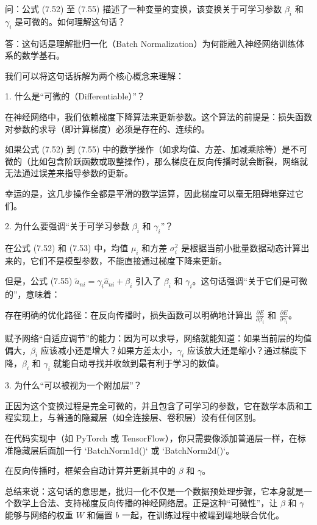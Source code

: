 \documentclass{article}
\begin{document}
{\color{blue}
问：公式 (7.52) 至 (7.55) 描述了一种变量的变换，该变换关于可学习参数 $\beta_i$ 和 $\gamma_i$ 是可微的。如何理解这句话？

答：这句话是理解批归一化（Batch Normalization）为何能融入神经网络训练体系的数学基石。

我们可以将这句话拆解为两个核心概念来理解：

1. 什么是“可微的（Differentiable）”？

在神经网络中，我们依赖梯度下降算法来更新参数。这个算法的前提是：损失函数对参数的求导（即计算梯度）必须是存在的、连续的。

如果公式 (7.52) 到 (7.55) 中的数学操作（如求均值、方差、加减乘除等）是不可微的（比如包含阶跃函数或取整操作），那么梯度在反向传播时就会断裂，网络就无法通过误差来指导参数的更新。

幸运的是，这几步操作全都是平滑的数学运算，因此梯度可以毫无阻碍地穿过它们。

2. 为什么要强调“关于可学习参数 $\beta_i$ 和 $\gamma_i$”？

在公式 (7.52) 和 (7.53) 中，均值 $\mu_i$ 和方差 $\sigma_i^2$ 是根据当前小批量数据动态计算出来的，它们不是模型参数，不能直接通过梯度下降来更新。

但是，公式 (7.55) $\widetilde{a}_{ni} = \gamma_i \widehat{a}_{ni} + \beta_i$ 引入了 $\beta_i$ 和 $\gamma_i$。这句话强调“关于它们是可微的”，意味着：

存在明确的优化路径：在反向传播时，损失函数可以明确地计算出 $\frac{\partial E}{\partial \beta_i}$ 和 $\frac{\partial E}{\partial \gamma_i}$。

赋予网络“自适应调节”的能力：因为可以求导，网络就能知道：如果当前层的均值偏大，$\beta_i$ 应该减小还是增大？如果方差太小，$\gamma_i$ 应该放大还是缩小？通过梯度下降，$\beta_i$ 和 $\gamma_i$ 就能自动寻找并收敛到最有利于学习的数值。

3. 为什么“可以被视为一个附加层”？

正因为这个变换过程是完全可微的，并且包含了可学习的参数，它在数学本质和工程实现上，与普通的隐藏层（如全连接层、卷积层）没有任何区别。

在代码实现中（如 PyTorch 或 TensorFlow），你只需要像添加普通层一样，在标准隐藏层后面加一行 `BatchNorm1d()` 或 `BatchNorm2d()`。

在反向传播时，框架会自动计算并更新其中的 $\beta$ 和 $\gamma$。

总结来说：这句话的意思是，批归一化不仅是一个数据预处理步骤，它本身就是一个数学上合法、支持梯度反向传播的神经网络层。正是这种“可微性”，让 $\beta$ 和 $\gamma$ 能够与网络的权重 $W$ 和偏置 $b$ 一起，在训练过程中被端到端地联合优化。

}
\end{document}
